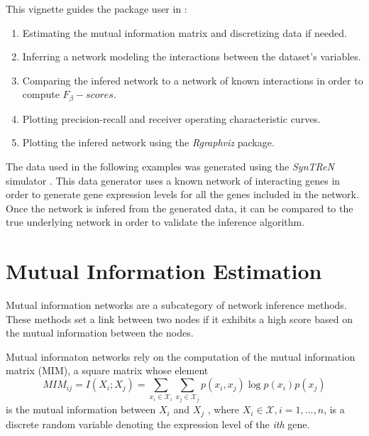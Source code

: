 \documentclass{article}
\newcommand{\Rpackage}[1]{{\textit{#1}}}
\begin{document}
This vignette guides the package user in :
\begin{enumerate}
\item Estimating the mutual information matrix and discretizing data if needed.
\item Inferring a network modeling the interactions between the dataset's variables.
\item Comparing the infered network to a network of known interactions in order to compute $F_\beta-scores$.
\item Plotting precision-recall and receiver operating characteristic curves.
\item Plotting the infered network using the \Rpackage{Rgraphviz} package. 
\end{enumerate}

The data used in the following examples was generated using the {\it SynTReN}
simulator \cite{syntren}. This data generator uses a known network of interacting genes
in order to generate gene expression levels for all the genes included in the network. 
Once the network is infered from the generated data, it can be compared to the true 
underlying network in order to validate the inference algorithm. 
\section{Mutual Information Estimation}
Mutual information networks are a subcategory of network inference methods.
These methods set a link between two nodes if it exhibits a high score based on
the mutual information between the nodes. 

Mutual informaton networks rely on the computation of the mutual information 
matrix (MIM), a square matrix whose element 
$$ MIM_{ij} = I(X_i ; X_j ) = \sum_{ x_i \in \mathcal{X}_i} \sum_{ x_j\in\mathcal{X}_j} p(x_i , x_j ) \log p(x_i )p(x_j ) $$
is the mutual information between $X_i$ and $X_j$ , where $X_i \in \mathcal{X} ,i = 1, . . . , n$, 
is a discrete random variable denoting the expression level of the \emph{ith} gene.
\end{document}
